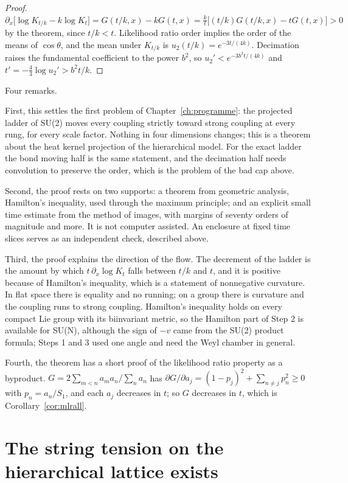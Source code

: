 \begin{proof}
$\partial_x\big[\log K_{t/k}-k\log K_t\big]=G(t/k,x)-kG(t,x)=\frac kt\big[(t/k)G(t/k,x)-tG(t,x)\big]>0$ by the theorem, since $t/k<t$. Likelihood ratio order implies the order of the means of $\cos\theta$, and the mean under $K_{t/k}$ is $u_2(t/k)=e^{-3t/(4k)}$. Decimation raises the fundamental coefficient to the power $b^2$, so $u_2'<e^{-3b^2t/(4k)}$ and $t'=-\frac43\log u_2'>b^2t/k$.
\end{proof}

Four remarks.

First, this settles the first problem of Chapter~\ref{ch:programme}: the projected ladder of SU(2) moves every coupling strictly toward strong coupling at every rung, for every scale factor. Nothing in four dimensions changes; this is a theorem about the heat kernel projection of the hierarchical model. For the exact ladder the bond moving half is the same statement, and the decimation half needs convolution to preserve the order, which is the problem of the bad cap above.

Second, the proof rests on two supports: a theorem from geometric analysis, Hamilton's inequality, used through the maximum principle; and an explicit small time estimate from the method of images, with margins of seventy orders of magnitude and more. It is not computer assisted. An enclosure at fixed time slices serves as an independent check, described above.

Third, the proof explains the direction of the flow. The decrement of the ladder is the amount by which $t\,\partial_x\log K_t$ falls between $t/k$ and $t$, and it is positive because of Hamilton's inequality, which is a statement of nonnegative curvature. In flat space there is equality and no running; on a group there is curvature and the coupling runs to strong coupling. Hamilton's inequality holds on every compact Lie group with its biinvariant metric, so the Hamilton part of Step 2 is available for SU(N), although the sign of $-v$ came from the SU(2) product formula; Steps 1 and 3 used one angle and need the Weyl chamber in general.

Fourth, the theorem has a short proof of the likelihood ratio property as a byproduct. $G=2\sum_{m<n}a_ma_n/\sum_na_n$ has $\partial G/\partial a_j=(1-p_j)^2+\sum_{n\ne j}p_n^2\ge0$ with $p_n=a_n/S_1$, and each $a_j$ decreases in $t$; so $G$ decreases in $t$, which is Corollary~\ref{cor:mlrall}.

\section{The string tension on the hierarchical lattice exists}

